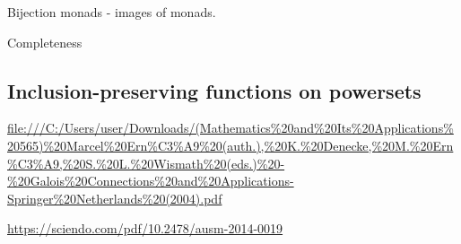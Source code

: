 \begin{proposition}
Bijection monads - images of monads.
\end{proposition}

\begin{definition}
Completeness
\end{definition}

\subsection{Inclusion-preserving functions on powersets}
\url{file:///C:/Users/user/Downloads/(Mathematics%20and%20Its%20Applications%20565)%20Marcel%20Ern%C3%A9%20(auth.),%20K.%20Denecke,%20M.%20Ern%C3%A9,%20S.%20L.%20Wismath%20(eds.)%20-%20Galois%20Connections%20and%20Applications-Springer%20Netherlands%20(2004).pdf}

\url{https://sciendo.com/pdf/10.2478/ausm-2014-0019}

